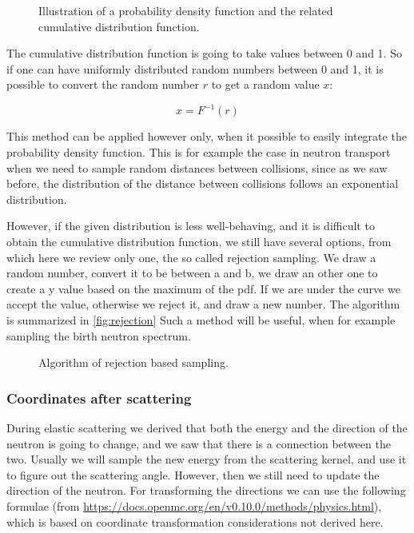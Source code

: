 \begin{figure}[ht!]
\protect {}\protect
\caption{\label{fig:pdfcdf} \footnotesize{Illustration of a probability density function and the related cumulative distribution function.}}
\end{figure}

The cumulative distribution function is going to take values between 0 and 1. So if one can have uniformly distributed random numbers between 0 and 1, it is possible to convert the random number $r$ to get a random value $x$:

\[
x=F^{-1}(r)
\]


This method can be applied however only, when it possible to easily integrate the probability density function. This is for example the case in neutron transport when we need to sample random distances between collisions, since as we saw before, the distribution of the distance between collisions follows an exponential distribution. 

However, if the given distribution is less well-behaving, and it is difficult to obtain the cumulative distribution function, we still have several options, from which here we review only one, the so called rejection sampling. We draw a random number, convert it to be between a and b, we draw an other one to create a y value based on the maximum of the pdf. If we are under the curve we accept the value, otherwise we reject it, and draw a new number. The algorithm is summarized in \autoref{fig:rejection} Such a method will be useful, when for example sampling the birth neutron spectrum.

\begin{figure}[ht!]
\protect {}\protect
\caption{\label{fig:rejection} \footnotesize{Algorithm of rejection based sampling.}}
\end{figure}

\subsubsection{Coordinates after scattering}

During elastic scattering we derived that both the energy and the direction of the neutron is going to change, and we saw that there is a connection between the two. Usually we will sample the new energy from the scattering kernel, and use it to figure out the scattering angle. However, then we still need to update the direction of the neutron. For transforming the directions we can use the following formulae (from \url{https://docs.openmc.org/en/v0.10.0/methods/physics.html}), which is based on coordinate transformation considerations not derived here.

